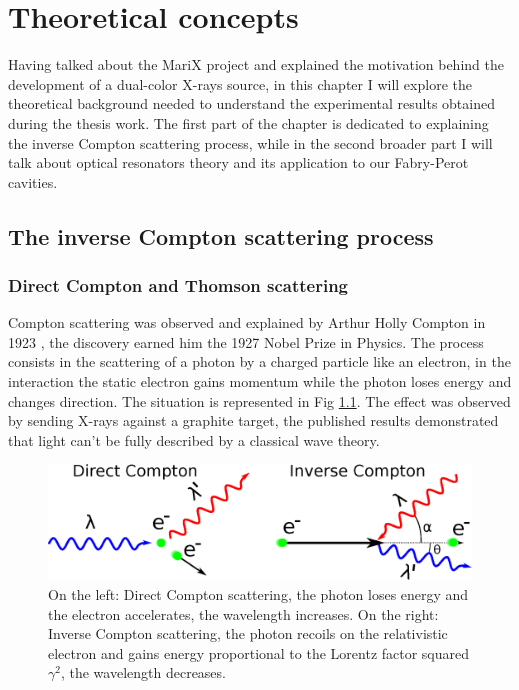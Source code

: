 \chapter{Theoretical concepts}

Having talked about the MariX project and explained the motivation behind the development of a dual-color X-rays source, in this chapter I will explore the theoretical background needed to understand the experimental results obtained during the thesis work.
The first part of the chapter is dedicated to explaining the inverse Compton scattering process, while in the second broader part I will talk about optical resonators theory and its application to our Fabry-Perot cavities.

\section{The inverse Compton scattering process}
\subsection{Direct Compton and Thomson scattering}
Compton scattering was observed and explained by Arthur Holly Compton in 1923 \parencite{Compton1923}, the discovery earned him the 1927 Nobel Prize in Physics. The process consists in the scattering of a photon by a charged particle like an electron, in the interaction the static electron gains momentum while the photon loses energy and changes direction. The situation is represented in Fig \ref{fig:compton}. The effect was observed by sending X-rays against a graphite target, the published results demonstrated that light can't be fully described by a classical wave theory.
\begin{figure}
	\centering
	\includegraphics[width=0.9\linewidth]{images/compton.eps}
	\caption{On the left: Direct Compton scattering, the photon loses energy and the electron accelerates, the wavelength increases.
	On the right: Inverse Compton scattering, the photon recoils on the relativistic electron and gains energy proportional to the Lorentz factor squared $\gamma^2$, the wavelength decreases.}
	\label{fig:compton}
\end{figure}


